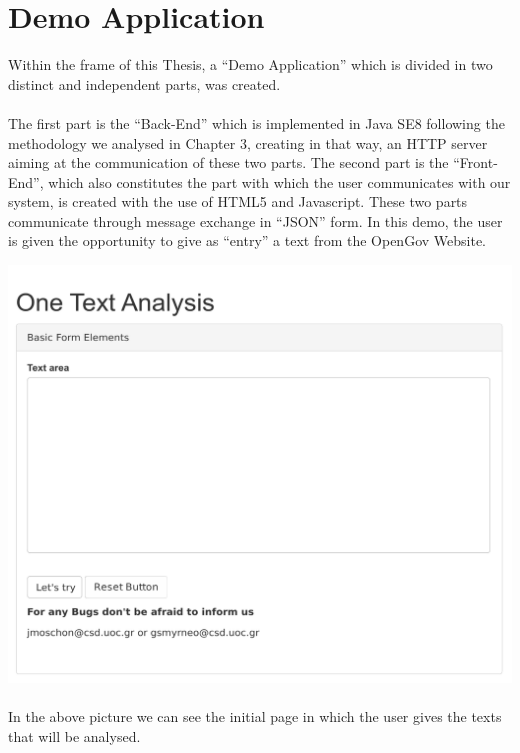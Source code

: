 
\chapter{Demo Application}
Within the frame of this Thesis, a ``Demo Application'' which is divided in two distinct and independent parts, was created.\\
\\
The first part is the ``Back-End'' which is implemented in Java SE8 following the methodology we analysed in Chapter 3, creating in that way, an HTTP server aiming at the communication of these two parts. The second part is the ``Front-End'', which also constitutes the part with which the user communicates with our system, is created with the use of HTML5 and Javascript. These two parts communicate through message exchange in ``JSON'' form. In this demo, the user is given the opportunity to give as ``entry'' a text from the OpenGov  Website.

\includegraphics[width=0.9\linewidth]{figure/screens/screen1_vector.pdf}
\\
\\
In the above picture we can see the initial page in which the user gives the texts that will be analysed.\\
\\

